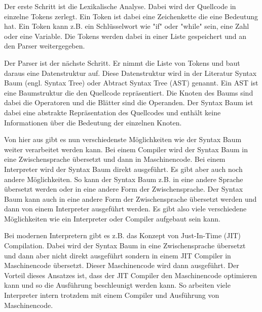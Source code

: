 \documentclass[ngerman]{article}
\begin{document}
Der erste Schritt ist die Lexikalische Analyse. Dabei wird der Quellcode in einzelne Tokens zerlegt. Ein Token ist dabei eine Zeichenkette die eine Bedeutung hat. Ein Token kann z.B. ein Schlüsselwort wie "if" oder "while" sein, eine Zahl oder eine Variable. Die Tokens werden dabei in einer Liste gespeichert und an den Parser weitergegeben.

Der Parser ist der nächste Schritt. Er nimmt die Liste von Tokens und baut daraus eine Datenstruktur auf. Diese Datenstruktur wird in der Literatur Syntax Baum (engl. Syntax Tree) oder Abtract Syntax Tree (AST) genannt. Ein AST ist eine Baumstruktur die den Quellcode repräsentiert. Die Knoten des Baums sind dabei die Operatoren und die Blätter sind die Operanden. Der Syntax Baum ist dabei eine abstrakte Repräsentation des Quellcodes und enthält keine Informationen über die Bedeutung der einzelnen Knoten. 

Von hier aus gibt es nun verschiedenste Möglichkeiten wie der Syntax Baum weiter verarbeitet werden kann. Bei einem Compiler wird der Syntax Baum in eine Zwischensprache übersetzt und dann in Maschinencode. Bei einem Interpreter wird der Syntax Baum direkt ausgeführt. Es gibt aber auch noch andere Möglichkeiten. So kann der Syntax Baum z.B. in eine andere Sprache übersetzt werden oder in eine andere Form der Zwischensprache. Der Syntax Baum kann auch in eine andere Form der Zwischensprache übersetzt werden und dann von einem Interpreter ausgeführt werden. Es gibt also viele verschiedene Möglichkeiten wie ein Interpreter oder Compiler aufgebaut sein kann.

Bei modernen Interpretern gibt es z.B. das Konzept von Just-In-Time (JIT) Compilation. Dabei wird der Syntax Baum in eine Zwischensprache übersetzt und dann aber nicht direkt ausgeführt sondern in einem JIT Compiler in Maschinencode übersetzt. Dieser Maschinencode wird dann ausgeführt. Der Vorteil dieses Ansatzes ist, dass der JIT Compiler den Maschinencode optimieren kann und so die Ausführung beschleunigt werden kann. So arbeiten viele Interpreter intern trotzdem mit einem Compiler und Ausführung von Maschinencode.
\end{document}
